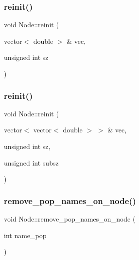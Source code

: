 \mbox{\label{class_node_a0a8fab0b8f38b3f8a85985da392ce1e1}} 
\subsubsection{\texorpdfstring{reinit()}{reinit()}\hspace{0.1cm}{\footnotesize\ttfamily [1/2]}}
{\footnotesize\ttfamily void Node\+::reinit (\begin{DoxyParamCaption}\item[{vector$<$ double $>$ \&}]{vec,  }\item[{unsigned int}]{sz }\end{DoxyParamCaption})\hspace{0.3cm}{\ttfamily [protected]}}

\mbox{\label{class_node_a2e2c14330fcafc1be40ea5740789bdef}} 
\subsubsection{\texorpdfstring{reinit()}{reinit()}\hspace{0.1cm}{\footnotesize\ttfamily [2/2]}}
{\footnotesize\ttfamily void Node\+::reinit (\begin{DoxyParamCaption}\item[{vector$<$ vector$<$ double $>$ $>$ \&}]{vec,  }\item[{unsigned int}]{sz,  }\item[{unsigned int}]{subsz }\end{DoxyParamCaption})\hspace{0.3cm}{\ttfamily [protected]}}

\mbox{\label{class_node_aff336c3c235a39299c807ff9dacd3852}} 
\subsubsection{\texorpdfstring{remove\_pop\_names\_on\_node()}{remove\_pop\_names\_on\_node()}}
{\footnotesize\ttfamily void Node\+::remove\+\_\+pop\+\_\+names\+\_\+on\+\_\+node (\begin{DoxyParamCaption}\item[{int}]{name\+\_\+pop }\end{DoxyParamCaption})}

